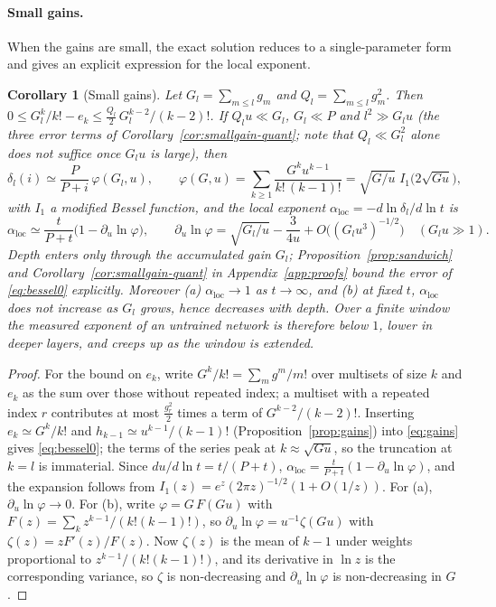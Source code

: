\documentclass[11pt]{article}
\newtheorem{corollary}{Corollary}
\theoremstyle{definition}
\theoremstyle{remark}
\begin{document}
\paragraph{Small gains.} When the gains are small, the exact solution reduces to a single-parameter form and gives an explicit expression for the local exponent.

\begin{corollary}[Small gains]\label{cor:smallgain}
Let $G_l=\sum_{m\le l}g_m$ and $Q_l=\sum_{m\le l}g_m^2$. Then $0\le G_l^k/k!-e_k\le\frac{Q_l}{2}\,G_l^{k-2}/(k-2)!$. If $Q_lu\ll G_l$, $G_l\ll P$ and $l^2\gg G_lu$ (the three error terms of Corollary~\ref{cor:smallgain-quant}; note that $Q_l\ll G_l^2$ alone does not suffice once $G_lu$ is large), then
\begin{equation}\label{eq:bessel0}
  \delta_l(i)\simeq\frac{P}{P+i}\,\varphi(G_l,u),\qquad
  \varphi(G,u)=\sum_{k\ge1}\frac{G^ku^{k-1}}{k!\,(k-1)!}=\sqrt{G/u}\;I_1\big(2\sqrt{Gu}\big),
\end{equation}
with $I_1$ a modified Bessel function, and the local exponent $\alpha_{\mathrm{loc}}=-d\ln\delta_l/d\ln t$ is
\begin{equation}\label{eq:bessel}
  \alpha_{\mathrm{loc}}\simeq\frac{t}{P+t}\big(1-\partial_u\ln\varphi\big),\qquad
  \partial_u\ln\varphi=\sqrt{G_l/u}-\frac{3}{4u}+O\big((G_lu^3)^{-1/2}\big)\quad(G_lu\gg1).
\end{equation}
Depth enters only through the accumulated gain $G_l$; Proposition~\ref{prop:sandwich} and Corollary~\ref{cor:smallgain-quant} in Appendix~\ref{app:proofs} bound the error of \eqref{eq:bessel0} explicitly. Moreover (a) $\alpha_{\mathrm{loc}}\to1$ as $t\to\infty$, and (b) at fixed $t$, $\alpha_{\mathrm{loc}}$ does not increase as $G_l$ grows, hence decreases with depth. Over a finite window the measured exponent of an untrained network is therefore below $1$, lower in deeper layers, and creeps up as the window is extended.
\end{corollary}
\begin{proof}
For the bound on $e_k$, write $G^k/k!=\sum_mg^m/m!$ over multisets of size $k$ and $e_k$ as the sum over those without repeated index; a multiset with a repeated index $r$ contributes at most $\tfrac{g_r^2}{2}$ times a term of $G^{k-2}/(k-2)!$. Inserting $e_k\simeq G^k/k!$ and $h_{k-1}\simeq u^{k-1}/(k-1)!$ (Proposition~\ref{prop:gains}) into \eqref{eq:gains} gives \eqref{eq:bessel0}; the terms of the series peak at $k\approx\sqrt{Gu}$, so the truncation at $k=l$ is immaterial. Since $du/d\ln t=t/(P+t)$, $\alpha_{\mathrm{loc}}=\frac{t}{P+t}(1-\partial_u\ln\varphi)$, and the expansion follows from $I_1(z)=e^z(2\pi z)^{-1/2}(1+O(1/z))$. For (a), $\partial_u\ln\varphi\to0$. For (b), write $\varphi=G\,F(Gu)$ with $F(z)=\sum_kz^{k-1}/(k!(k-1)!)$, so $\partial_u\ln\varphi=u^{-1}\zeta(Gu)$ with $\zeta(z)=zF'(z)/F(z)$. Now $\zeta(z)$ is the mean of $k-1$ under weights proportional to $z^{k-1}/(k!(k-1)!)$, and its derivative in $\ln z$ is the corresponding variance, so $\zeta$ is non-decreasing and $\partial_u\ln\varphi$ is non-decreasing in $G$.
\end{proof}
\end{document}
